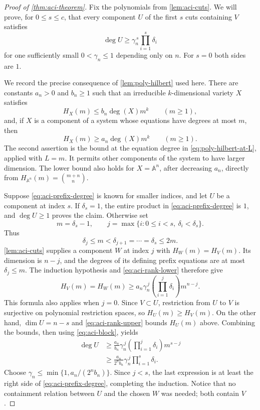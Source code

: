\begin{proof}[Proof of \cref{thm:aci-theorem}]
Fix the polynomials from \cref{lem:aci-cuts}.  We will prove, for $0\le s\le c$, that every component $U$ of the first $s$ cuts containing $V$ satisfies
\begin{equation}
 \deg U\ge\gamma_n^{\,s}\prod_{i=1}^s\delta_i
 \label{eq:aci-prefix-degree}
\end{equation}
for one sufficiently small $0<\gamma_n\le1$ depending only on $n$. For $s=0$ both sides are $1$.

We record the precise consequence of \cref{lem:poly-hilbert} used here.  There are constants $a_n>0$ and $b_n\ge1$ such that an irreducible $k$-dimensional variety $X$ satisfies
\begin{equation}
 H_X(m)\le b_n\deg(X)m^k\qquad(m\ge1),
 \label{eq:aci-rank-upper}
\end{equation}
and, if $X$ is a component of a system whose equations have degrees at most $m$, then
\begin{equation}
 H_X(m)\ge a_n\deg(X)m^k\qquad(m\ge1).
 \label{eq:aci-rank-lower}
\end{equation}
The second assertion is the bound at the equation degree in \eqref{eq:poly-hilbert-at-L}, applied with $L=m$.  It permits other components of the system to have larger dimension.  The lower bound also holds for $X=\mathbb{A}^n$, after decreasing $a_n$, directly from $H_{\mathbb{A}^n}(m)=\binom{m+n}{n}$.

Suppose \eqref{eq:aci-prefix-degree} is known for smaller indices, and let $U$ be a component at index $s$.  If $\delta_s=1$, the entire product in \eqref{eq:aci-prefix-degree} is $1$, and $\deg U\ge1$ proves the claim.  Otherwise set
\[
 m=\delta_s-1,\qquad
 j=\max\{i:0\le i<s,\ \delta_i<\delta_s\}.
\]
Thus
\begin{equation}
 \delta_j\le m<\delta_{j+1}
   =\cdots=\delta_s\le2m.
 \label{eq:aci-block}
\end{equation}
\cref{lem:aci-cuts} supplies a component $W$ at index $j$ with $H_W(m)=H_V(m)$.  Its dimension is $n-j$, and the degrees of its defining prefix equations are at most $\delta_j\le m$. The induction hypothesis and \eqref{eq:aci-rank-lower} therefore give
\[
 H_V(m)=H_W(m)
 \ge a_n\gamma_n^{\,j}
       \left(\prod_{i=1}^j\delta_i\right)m^{n-j}.
\]
This formula also applies when $j=0$.  Since $V\subset U$, restriction from $U$ to $V$ is surjective on polynomial restriction spaces, so $H_U(m)\ge H_V(m)$.  On the other hand, $\dim U=n-s$ and \eqref{eq:aci-rank-upper} bounds $H_U(m)$ above.  Combining the bounds, then using \eqref{eq:aci-block}, yields
\[
 \begin{split}
 \deg U
 &\ge \frac{a_n}{b_n}\gamma_n^{\,j}
       \left(\prod_{i=1}^j\delta_i\right)m^{s-j}\\
 &\ge \frac{a_n}{2^n b_n}\gamma_n^{\,j}
       \prod_{i=1}^s\delta_i.
 \end{split}
\]
Choose $\gamma_n\le\min\{1,a_n/(2^n b_n)\}$.  Since $j<s$, the last expression is at least the right side of \eqref{eq:aci-prefix-degree}, completing the induction.  Notice that no containment relation between $U$ and the chosen $W$ was needed; both contain $V$.


\end{proof}
